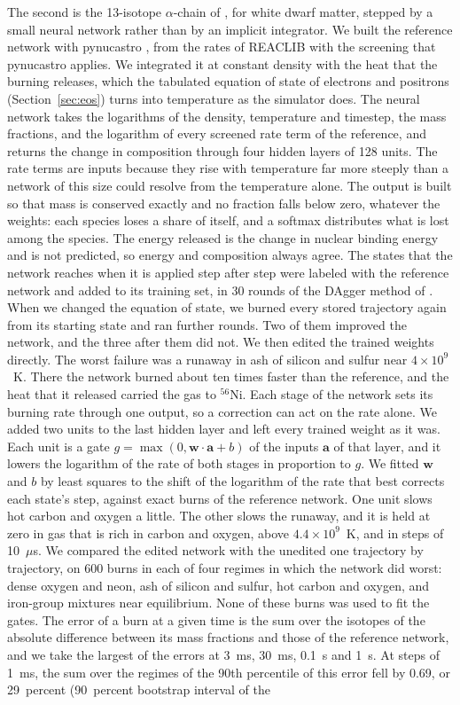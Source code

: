 \documentclass[twocolumn]{aastex701}
\begin{document}
The second is the 13-isotope $\alpha$-chain of \citet{Timmes2000}, for white dwarf matter, stepped by a small neural network rather than by an implicit integrator. We built the reference network with pynucastro \citep{SmithClark2023}, from the rates of REACLIB \citep{Cyburt2010} with the screening that pynucastro applies. We integrated it at constant density with the heat that the burning releases, which the tabulated equation of state of electrons and positrons (Section~\ref{sec:eos}) turns into temperature as the simulator does. The neural network takes the logarithms of the density, temperature and timestep, the mass fractions, and the logarithm of every screened rate term of the reference, and returns the change in composition through four hidden layers of 128 units. The rate terms are inputs because they rise with temperature far more steeply than a network of this size could resolve from the temperature alone. The output is built so that mass is conserved exactly and no fraction falls below zero, whatever the weights: each species loses a share of itself, and a softmax distributes what is lost among the species. The energy released is the change in nuclear binding energy and is not predicted, so energy and composition always agree. The states that the network reaches when it is applied step after step were labeled with the reference network and added to its training set, in 30 rounds of the DAgger method of \citet{Ross2011}. When we changed the equation of state, we burned every stored trajectory again from its starting state and ran further rounds. Two of them improved the network, and the three after them did not. We then edited the trained weights directly. The worst failure was a runaway in ash of silicon and sulfur near $4\times10^9$~K. There the network burned about ten times faster than the reference, and the heat that it released carried the gas to $^{56}$Ni. Each stage of the network sets its burning rate through one output, so a correction can act on the rate alone. We added two units to the last hidden layer and left every trained weight as it was. Each unit is a gate $g = \max(0, \mathbf{w}\cdot\mathbf{a} + b)$ of the inputs $\mathbf{a}$ of that layer, and it lowers the logarithm of the rate of both stages in proportion to $g$. We fitted $\mathbf{w}$ and $b$ by least squares to the shift of the logarithm of the rate that best corrects each state's step, against exact burns of the reference network. One unit slows hot carbon and oxygen a little. The other slows the runaway, and it is held at zero in gas that is rich in carbon and oxygen, above $4.4\times10^9$~K, and in steps of 10~$\mu$s. We compared the edited network with the unedited one trajectory by trajectory, on 600 burns in each of four regimes in which the network did worst: dense oxygen and neon, ash of silicon and sulfur, hot carbon and oxygen, and iron-group mixtures near equilibrium. None of these burns was used to fit the gates. The error of a burn at a given time is the sum over the isotopes of the absolute difference between its mass fractions and those of the reference network, and we take the largest of the errors at 3~ms, 30~ms, 0.1~s and 1~s. At steps of 1~ms, the sum over the regimes of the 90th percentile of this error fell by 0.69, or 29~percent (90~percent bootstrap interval of the 
\end{document}
